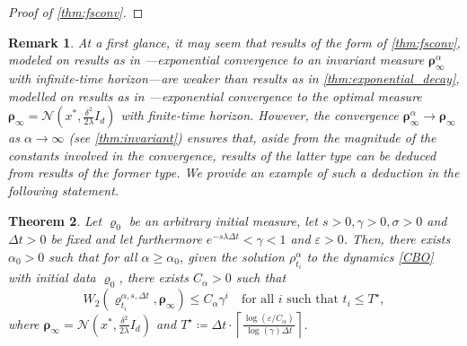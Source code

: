 \documentclass[reqno]{amsart}
\numberwithin{algorithm}{section}
\newcommand{\mc}[1]{\mathcal{#1}}
\newtheorem{theorem}{Theorem}[section]
\newtheorem{remark}[theorem]{Remark}
\newcommand{\hh}[1]{{\color{blue}{#1}}}
\begin{document}
{\begin{proof}[Proof of \cref{thm:fsconv}]
\end{proof}
{
\begin{remark}
    At a first glance, it may seem that results of the form of \cref{thm:fsconv}, modeled on results as in \cite{huang2025faithful}---exponential convergence to an invariant measure $\boldsymbol\rho_\infty^\alpha$ with infinite-time horizon---are weaker than results as in \cref{thm:exponential_decay}, modelled on results as in \cite{B1-fornasier2021global}---exponential convergence to the optimal measure $\boldsymbol\rho_\infty = \mc{N}(x^*, \frac{\delta^2}{2\lambda} I_d)$ with finite-time horizon. However, the convergence $\boldsymbol\rho_\infty^\alpha \to \boldsymbol\rho_\infty$ as $\alpha \to \infty$ (see \cref{thm:invariant}) ensures that, aside from the magnitude of the constants involved in the convergence, results of the latter type can be deduced from results of the former type. We provide an example of such a deduction in the following statement.
\end{remark}
\begin{theorem}
    Let $\varrho_0$ be an arbitrary initial measure, let $s > 0, \gamma > 0, \sigma > 0$ and $\Delta t > 0$ be fixed and let furthermore $e^{-s \lambda \Delta t}<\gamma<1$ and $\varepsilon > 0$. Then, there exists $\alpha_0 > 0$ such that for all $\alpha \geq \alpha_0$, given the solution $\rho_{t_i}^\alpha$ to the dynamics \eqref{CBO} with initial data $\varrho_0$, there exists $C_\alpha > 0$ such that
    \begin{equation}
        W_2(\varrho_{t_i}^{\alpha,s,\Delta t}, \boldsymbol\rho_\infty) \leq C_\alpha \gamma^i \quad \text{for all } i \text{ such that } t_i \leq T^\star,
    \end{equation}
    where $\boldsymbol\rho_\infty = \mc{N}(x^*, \frac{\delta^2}{2\lambda} I_d)$ and $T^\star \coloneqq  \Delta t \cdot \left\lceil\frac{\log(\varepsilon/C_\alpha)}{\log(\gamma) \Delta t}\right\rceil$.

\end{theorem}}}
\end{document}
